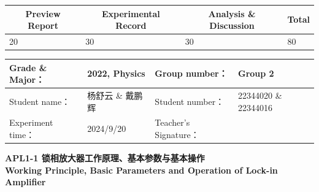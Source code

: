 


\begin{table}
	\renewcommand\arraystretch{1.7}
	\begin{tabularx}{\textwidth}{
			|X|X|X|X
			|X|X|X|X|}
		\hline
		\multicolumn{2}{|c|}{Preview Report}&\multicolumn{2}{|c|}{Experimental Record}&\multicolumn{2}{|c|}{Analysis \& Discussion}&\multicolumn{2}{|c|}{\Large\textbf{Total}}\\
		\hline
		\LARGE20 & & \LARGE30 & & \LARGE30 & & \LARGE80 & \\
		\hline
	\end{tabularx}
\end{table}


\begin{table}
	\renewcommand\arraystretch{1.7}
	\begin{tabularx}{\textwidth}{|X|X|X|X|}
		\hline
		Grade \& Major： & 2022, Physics &Group number： & Group 2\\
		\hline
		Student name： & 杨舒云 \& 戴鹏辉  & Student number： & 22344020 \& 22344016\\
		\hline
		Experiment time： & 2024/9/20 & Teacher's Signature： & \\
		\hline
	\end{tabularx}
\end{table}


\begin{center}
	\huge \textbf{APL1-1 \quad 锁相放大器工作原理、基本参数与基本操作\\Working Principle, Basic Parameters and Operation of Lock-in Amplifier}
\end{center}


